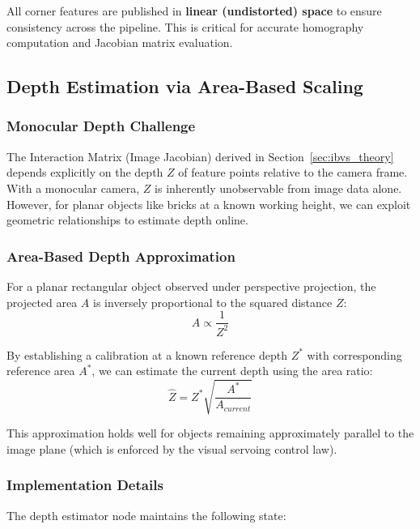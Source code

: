 All corner features are published in \textbf{linear (undistorted) space} to ensure consistency across the pipeline. This is critical for accurate homography computation and Jacobian matrix evaluation.

\subsection{Depth Estimation via Area-Based Scaling}

\subsubsection{Monocular Depth Challenge}
The Interaction Matrix (Image Jacobian) derived in Section~\ref{sec:ibvs_theory} depends explicitly on the depth $Z$ of feature points relative to the camera frame. With a monocular camera, $Z$ is inherently unobservable from image data alone. However, for planar objects like bricks at a known working height, we can exploit geometric relationships to estimate depth online.

\subsubsection{Area-Based Depth Approximation}
For a planar rectangular object observed under perspective projection, the projected area $A$ is inversely proportional to the squared distance $Z$:
\begin{equation}
    A \propto \frac{1}{Z^2}
\end{equation}

By establishing a calibration at a known reference depth $Z^*$ with corresponding reference area $A^*$, we can estimate the current depth using the area ratio:
\begin{equation}
    \hat{Z} = Z^* \sqrt{\frac{A^*}{A_{current}}}
    \label{eq:area_depth}
\end{equation}

This approximation holds well for objects remaining approximately parallel to the image plane (which is enforced by the visual servoing control law).

\subsubsection{Implementation Details}
The depth estimator node maintains the following state:

